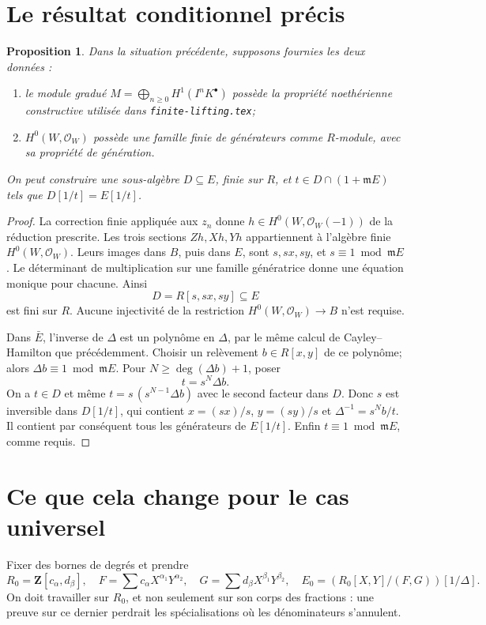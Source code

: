 \documentclass[11pt]{amsart}
\newtheorem{proposition}[lemma]{Proposition}
\newcommand{\OO}{\mathcal O}
\newcommand{\m}{\mathfrak m}
\begin{document}
\section{Le résultat conditionnel précis}

\begin{proposition}\label{hull}
Dans la situation précédente, supposons fournies les deux données :
\begin{enumerate}
\item le module gradué
$M=\bigoplus_{n\geq0}H^1(I^nK^\bullet)$ possède la propriété
noethérienne constructive utilisée dans \texttt{finite-lifting.tex};
\item $H^0(W,\OO_W)$ possède une famille finie de générateurs comme
$R$-module, avec sa propriété de génération.
\end{enumerate}
On peut construire une sous-algèbre $D\subseteq E$, finie sur $R$,
et $t\in D\cap(1+\m E)$ tels que $D[1/t]=E[1/t]$.
\end{proposition}
\begin{proof}
La correction finie appliquée aux $z_n$ donne
$h\in H^0(W,\OO_W(-1))$ de la réduction prescrite.
Les trois sections $Zh,Xh,Yh$ appartiennent à l'algèbre finie
$H^0(W,\OO_W)$. Leurs images dans $B$, puis dans $E$, sont
$s,sx,sy$, et $s\equiv1\bmod\m E$.
Le déterminant de multiplication sur une famille génératrice donne
une équation monique pour chacune. Ainsi
\[
 D=R[s,sx,sy]\subseteq E
\]
est fini sur $R$. Aucune injectivité de la restriction
$H^0(W,\OO_W)\to B$ n'est requise.

Dans $\bar E$, l'inverse de $\Delta$ est un polynôme en $\Delta$,
par le même calcul de Cayley--Hamilton que précédemment. Choisir
un relèvement $b\in R[x,y]$ de ce polynôme; alors
$\Delta b\equiv1\bmod\m E$.
Pour $N\geq\deg(\Delta b)+1$, poser
\[
 t=s^N\Delta b.
\]
On a $t\in D$ et même $t=s\,(s^{N-1}\Delta b)$ avec le second
facteur dans $D$. Donc $s$ est inversible dans $D[1/t]$, qui contient
$x=(sx)/s$, $y=(sy)/s$ et
$\Delta^{-1}=s^Nb/t$.
Il contient par conséquent tous les générateurs de $E[1/t]$.
Enfin $t\equiv1\bmod\m E$, comme requis.
\end{proof}

\section{Ce que cela change pour le cas universel}

Fixer des bornes de degrés et prendre
\[
 R_0=\mathbf Z[c_\alpha,d_\beta],\quad
 F=\sum c_\alpha X^{\alpha_1}Y^{\alpha_2},\quad
 G=\sum d_\beta X^{\beta_1}Y^{\beta_2},\quad
 E_0=(R_0[X,Y]/(F,G))[1/\Delta].
\]
On doit travailler sur $R_0$, et non seulement sur son corps des
fractions : une preuve sur ce dernier perdrait les spécialisations
où les dénominateurs s'annulent.
\end{document}
